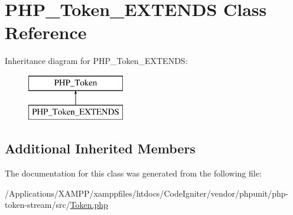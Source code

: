 \hypertarget{class_p_h_p___token___e_x_t_e_n_d_s}{}\section{P\+H\+P\+\_\+\+Token\+\_\+\+E\+X\+T\+E\+N\+DS Class Reference}
\label{class_p_h_p___token___e_x_t_e_n_d_s}
Inheritance diagram for P\+H\+P\+\_\+\+Token\+\_\+\+E\+X\+T\+E\+N\+DS\+:\begin{figure}[H]
\begin{center}
\leavevmode
\includegraphics[height=2.000000cm]{class_p_h_p___token___e_x_t_e_n_d_s}
\end{center}
\end{figure}
\subsection*{Additional Inherited Members}


The documentation for this class was generated from the following file\+:\begin{DoxyCompactItemize}
\item 
/\+Applications/\+X\+A\+M\+P\+P/xamppfiles/htdocs/\+Code\+Igniter/vendor/phpunit/php-\/token-\/stream/src/\mbox{\hyperlink{_token_8php}{Token.\+php}}\end{DoxyCompactItemize}
